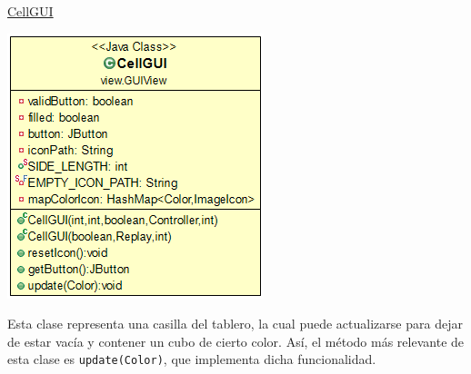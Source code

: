 \documentclass[12pt,a4paper,openright]{book}
\theoremstyle{break}
\begin{document}
\newpage

\underline{CellGUI}
\begin{center}
\includegraphics[scale=0.65]{cellgui.png}
\end{center}

Esta clase representa una casilla del tablero, la cual puede actualizarse para dejar de estar vacía y contener un cubo de cierto color. Así, el método más relevante de esta clase es \texttt{update(Color)}, que implementa dicha funcionalidad.
\end{document}
